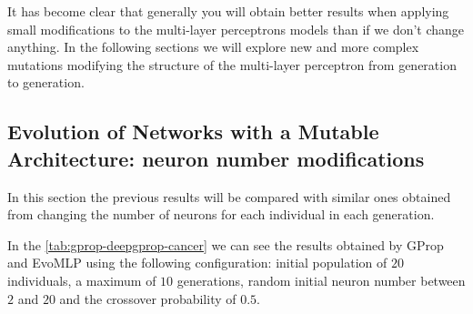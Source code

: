 \documentclass[runningheads]{llncs}
\begin{document}
It has become clear that generally you will obtain better results when applying
small modifications to the multi-layer perceptrons models than if we don't
change anything. In the following sections we will explore new and more complex
mutations modifying the structure of the multi-layer perceptron from generation
to generation.


\subsection{Evolution of Networks with a Mutable Architecture: neuron number modifications}


In this section the previous results will be compared with similar ones
obtained from changing the number of neurons for each individual in each
generation.


In the \autoref{tab:gprop-deepgprop-cancer} we can see the results obtained by
GProp and {\sf EvoMLP} using the following configuration: initial population of
$20$ individuals, a maximum of $10$ generations, random initial neuron number
between $2$ and $20$ and the crossover probability of $0.5$.
\end{document}
